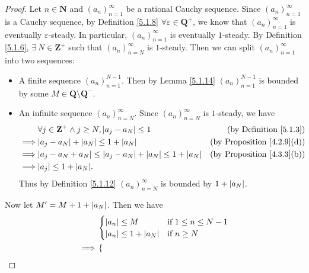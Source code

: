 \begin{proof}
    Let \(n \in \mathbf{N}\) and \((a_n)_{n = 1}^{\infty}\) be a rational Cauchy sequence.
    Since \((a_n)_{n = 1}^{\infty}\) is a Cauchy sequence, by Definition \ref{5.1.8} \(\forall \varepsilon \in \mathbf{Q}^+\), we know that \((a_n)_{n = 1}^{\infty}\) is eventually \(\varepsilon\)-steady.
    In particular, \((a_n)_{n = 1}^{\infty}\) is eventually \(1\)-steady.
    By Definition \ref{5.1.6}, \(\exists\ N \in \mathbf{Z}^+\) such that \((a_n)_{n = N}^{\infty}\) is \(1\)-steady.
    Then we can split \((a_n)_{n = 1}^{\infty}\) into two sequences:
    \begin{itemize}
        \item A finite sequence \((a_n)_{n = 1}^{N - 1}\).
              Then by Lemma \ref{5.1.14} \((a_n)_{n = 1}^{N - 1}\) is bounded by some \(M \in \mathbf{Q} \setminus \mathbf{Q}^-\).
        \item An infinite sequence \((a_n)_{n = N}^{\infty}\).
              Since \((a_n)_{n = N}^\infty\) is \(1\)-steady, we have
              \begin{align*}
                           & \forall j \in \mathbf{Z}^+ \land j \geq N, \abs*{a_j - a_N} \leq 1            & \text{(by Definition \ref{5.1.3})}     \\
                  \implies & \abs*{a_j - a_N} + \abs*{a_N} \leq 1 + \abs*{a_N}                             & \text{(by Proposition \ref{4.2.9}(d))} \\
                  \implies & \abs*{a_j - a_N + a_N} \leq \abs*{a_j - a_N} + \abs*{a_N} \leq 1 + \abs*{a_N} & \text{(by Proposition \ref{4.3.3}(b))} \\
                  \implies & \abs*{a_j} \leq 1 + \abs*{a_N}.
              \end{align*}
              Thus by Definition \ref{5.1.12} \((a_n)_{n = N}^\infty\) is bounded by \(1 + \abs*{a_N}\).
    \end{itemize}
    Now let \(M' = M + 1 + \abs*{a_N}\).
    Then we have
    \begin{align*}
                 & \begin{cases}
                       \abs*{a_n} \leq M              & \text{if } 1 \leq n \leq N - 1 \\
                       \abs*{a_n} \leq 1 + \abs*{a_N} & \text{if } n \geq N
                   \end{cases}                                                  \\
        \implies & \begin{cases}

\end{cases}
\end{align*}
\end{proof}
